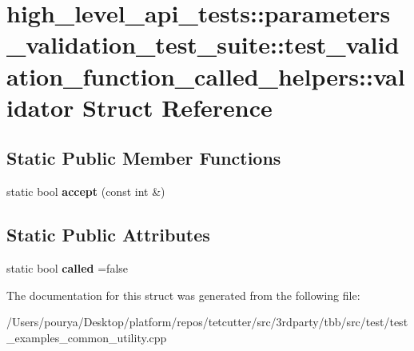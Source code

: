 \hypertarget{structhigh__level__api__tests_1_1parameters__validation__test__suite_1_1test__validation__functia797b402ca83a0537e6d95ae3e40d7c5}{}\section{high\+\_\+level\+\_\+api\+\_\+tests\+:\+:parameters\+\_\+validation\+\_\+test\+\_\+suite\+:\+:test\+\_\+validation\+\_\+function\+\_\+called\+\_\+helpers\+:\+:validator Struct Reference}
\label{structhigh__level__api__tests_1_1parameters__validation__test__suite_1_1test__validation__functia797b402ca83a0537e6d95ae3e40d7c5}
\subsection*{Static Public Member Functions}
\begin{DoxyCompactItemize}
\item 
\hypertarget{structhigh__level__api__tests_1_1parameters__validation__test__suite_1_1test__validation__functia797b402ca83a0537e6d95ae3e40d7c5_a69fce8aac6f68c27ebfe651c144b9a6d}{}static bool {\bfseries accept} (const int \&)\label{structhigh__level__api__tests_1_1parameters__validation__test__suite_1_1test__validation__functia797b402ca83a0537e6d95ae3e40d7c5_a69fce8aac6f68c27ebfe651c144b9a6d}

\end{DoxyCompactItemize}
\subsection*{Static Public Attributes}
\begin{DoxyCompactItemize}
\item 
\hypertarget{structhigh__level__api__tests_1_1parameters__validation__test__suite_1_1test__validation__functia797b402ca83a0537e6d95ae3e40d7c5_ad3e08e1af9e8736a33c59a878273c0b5}{}static bool {\bfseries called} =false\label{structhigh__level__api__tests_1_1parameters__validation__test__suite_1_1test__validation__functia797b402ca83a0537e6d95ae3e40d7c5_ad3e08e1af9e8736a33c59a878273c0b5}

\end{DoxyCompactItemize}


The documentation for this struct was generated from the following file\+:\begin{DoxyCompactItemize}
\item 
/\+Users/pourya/\+Desktop/platform/repos/tetcutter/src/3rdparty/tbb/src/test/test\+\_\+examples\+\_\+common\+\_\+utility.\+cpp\end{DoxyCompactItemize}
